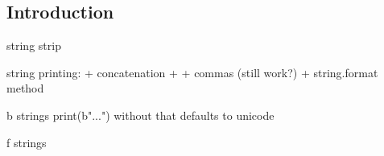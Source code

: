 
\subsection{Introduction}

string strip

string printing:
+ concatenation
+ %
+ commas (still work?)
+ string.format method

b strings print(b"...")
without that defaults to unicode

f strings
